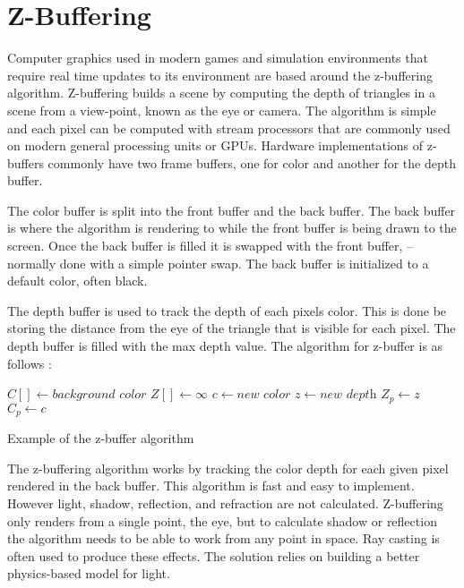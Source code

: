 \section{Z-Buffering}

Computer graphics used in modern games and simulation environments that require real time updates to its environment are based around the z-buffering algorithm.  Z-buffering builds a scene by computing the depth of triangles in a scene from a view-point,  known as the eye or camera.  The algorithm is simple and each pixel can be computed with stream processors that are commonly  used on modern general processing units or GPUs.  Hardware implementations of z-buffers commonly have two frame buffers, one for color and another for the depth buffer.   

 The color buffer is split into the front buffer and the back buffer.  The back buffer is where the algorithm is rendering to while the front buffer is being drawn to the screen.  Once the back buffer is filled it is swapped with the front buffer,  -- normally done with a simple pointer swap.  The back buffer is initialized to a default color, often black.
 
 The depth buffer is used to track the depth of each pixels color.  This is done be storing the distance from the eye of the triangle that is visible for each pixel.  The depth buffer is filled with the max depth value.  The algorithm for z-buffer is as follows \cite{fast:2008}:

\begin{algorithm}
\begin{algorithmic}[1]
\STATE $C[ ] \gets \textit{background color}$ 
\STATE $Z[ ] \gets \infty$
		\STATE $c \gets \textit{new color}$
		\STATE $z \gets \textit{new depth}$
			\STATE $Z_{p} \gets z$
			\STATE $C_{p} \gets c$
		\ENDIF
	\ENDFOR
\ENDFOR
\end{algorithmic}
\caption{Example of the z-buffer algorithm}
\label{z-buffer}
\end{algorithm}

The z-buffering algorithm works by tracking the color depth for each given pixel rendered in the back buffer.  This algorithm is fast and easy to implement.  However light, shadow, reflection, and refraction are not calculated.   Z-buffering only renders from a single point, the eye, but to calculate shadow or reflection the algorithm needs to be able to work from any point in space.  Ray casting is often used to produce these effects.  The solution relies on building a better physics-based model for light.
